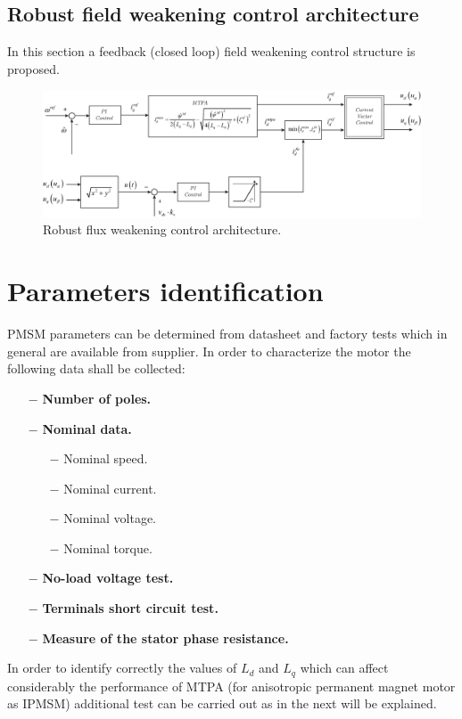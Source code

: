 \documentclass[11pt,a4paper]{article}
\numberwithin{equation}{section}
\theoremstyle{it}
\theoremstyle{definition}
\begin{document}
\begin{onehalfspace}
\subsection{Robust field weakening control architecture}
In this section a feedback (closed loop) field weakening control structure is proposed. 

\begin{figure}[H]
	\centering
	\includegraphics[width = 450pt, keepaspectratio]{figures/deflux/closed_loop_fw_1.eps}
	\captionsetup{width=0.5\textwidth, font=small}
	\caption{Robust flux weakening control architecture.}
	\label{}
\end{figure}

\section{Parameters identification}
PMSM parameters can be determined from datasheet and factory tests which in general are available from supplier. In order to characterize the motor the following data shall be collected:
\begin{itemize}
		\item[$-$] \textbf{Number of poles.}
		\item[$-$] \textbf{Nominal data.}
	\begin{itemize}
		\item[$-$] Nominal speed.
		\item[$-$] Nominal current.
		\item[$-$] Nominal voltage.
		\item[$-$] Nominal torque.
	\end{itemize}
	\item[$-$] \textbf{No-load voltage test.}
	\item[$-$] \textbf{Terminals short circuit test.}
	\item[$-$] \textbf{Measure of the stator phase resistance.}
\end{itemize}
In order to identify correctly the values of $L_d$ and $L_q$ which can affect considerably the performance of MTPA (for anisotropic permanent magnet motor as IPMSM) additional test can be carried out as in the next will be explained.


\end{onehalfspace}
\end{document}
